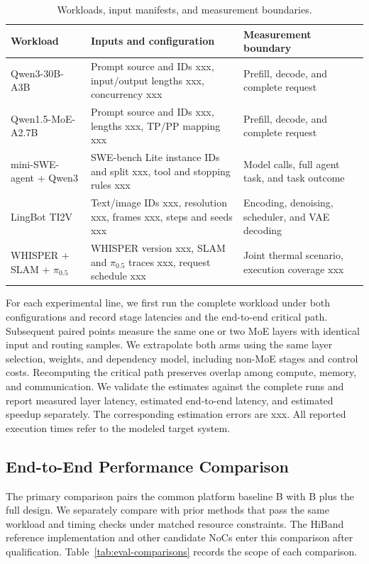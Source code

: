 \documentclass[conference,10pt]{IEEEtran}
\begin{document}
\begin{table}[t]
\caption{Workloads, input manifests, and measurement boundaries.}
\label{tab:eval-workloads}
\centering\small
\begin{tabularx}{\textwidth}{@{}p{}Xp{}@{}}
\hline
Workload & Inputs and configuration & Measurement boundary \\
\hline
Qwen3-30B-A3B & Prompt source and IDs xxx, input/output lengths xxx, concurrency xxx & Prefill, decode, and complete request \\
Qwen1.5-MoE-A2.7B & Prompt source and IDs xxx, lengths xxx, TP/PP mapping xxx & Prefill, decode, and complete request \\
mini-SWE-agent + Qwen3 & SWE-bench Lite instance IDs and split xxx, tool and stopping rules xxx & Model calls, full agent task, and task outcome \\
LingBot TI2V & Text/image IDs xxx, resolution xxx, frames xxx, steps and seeds xxx & Encoding, denoising, scheduler, and VAE decoding \\
WHISPER + SLAM + $\pi_{0.5}$ & WHISPER version xxx, SLAM and $\pi_{0.5}$ traces xxx, request schedule xxx & Joint thermal scenario, execution coverage xxx \\
\hline
\end{tabularx}
\end{table}

For each experimental line, we first run the complete workload under both configurations and record stage latencies and the end-to-end critical path. Subsequent paired points measure the same one or two MoE layers with identical input and routing samples. We extrapolate both arms using the same layer selection, weights, and dependency model, including non-MoE stages and control costs. Recomputing the critical path preserves overlap among compute, memory, and communication. We validate the estimates against the complete runs and report measured layer latency, estimated end-to-end latency, and estimated speedup separately. The corresponding estimation errors are xxx. All reported execution times refer to the modeled target system.

\subsection{End-to-End Performance Comparison}

The primary comparison pairs the common platform baseline B with B plus the full design. We separately compare with prior methods that pass the same workload and timing checks under matched resource constraints. The HiBand reference implementation and other candidate NoCs enter this comparison after qualification. Table~\ref{tab:eval-comparisons} records the scope of each comparison.
\end{document}
